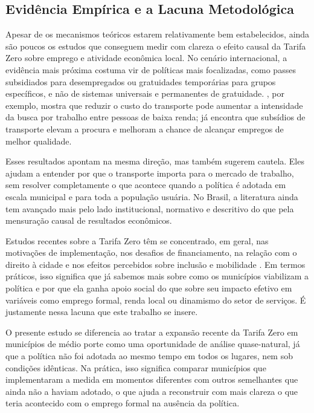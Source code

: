 \documentclass[12pt, a4paper]{article}
\begin{document}
\subsection{Evidência Empírica e a Lacuna Metodológica}
Apesar de os mecanismos teóricos estarem relativamente bem estabelecidos, ainda são poucos os estudos que conseguem medir com clareza o efeito causal da Tarifa Zero sobre emprego e atividade econômica local.
No cenário internacional, a evidência mais próxima costuma vir de políticas mais focalizadas, como passes subsidiados para desempregados ou gratuidades temporárias para grupos específicos, e não de sistemas universais e permanentes de gratuidade.
\citet{phillips2014}, por exemplo, mostra que reduzir o custo do transporte pode aumentar a intensidade da busca por trabalho entre pessoas de baixa renda; já \citet{Franklin2018} encontra que subsídios de transporte elevam a procura e melhoram a chance de alcançar empregos de melhor qualidade.

Esses resultados apontam na mesma direção, mas também sugerem cautela.
Eles ajudam a entender por que o transporte importa para o mercado de trabalho, sem resolver completamente o que acontece quando a política é adotada em escala municipal e para toda a população usuária.
No Brasil, a literatura ainda tem avançado mais pelo lado institucional, normativo e descritivo do que pela mensuração causal de resultados econômicos.

Estudos recentes sobre a Tarifa Zero têm se concentrado, em geral, nas motivações de implementação, nos desafios de financiamento, na relação com o direito à cidade e nos efeitos percebidos sobre inclusão e mobilidade \citep{pereiravermanderkeblowski2023, sartori2023, sampaio2024}.
Em termos práticos, isso significa que já sabemos mais sobre como os municípios viabilizam a política e por que ela ganha apoio social do que sobre seu impacto efetivo em variáveis como emprego formal, renda local ou dinamismo do setor de serviços.
É justamente nessa lacuna que este trabalho se insere.

O presente estudo se diferencia ao tratar a expansão recente da Tarifa Zero em municípios de médio porte como uma oportunidade de análise quase-natural, já que a política não foi adotada ao mesmo tempo em todos os lugares, nem sob condições idênticas.
Na prática, isso significa comparar municípios que implementaram a medida em momentos diferentes com outros semelhantes que ainda não a haviam adotado, o que ajuda a reconstruir com mais clareza o que teria acontecido com o emprego formal na ausência da política.
\end{document}
